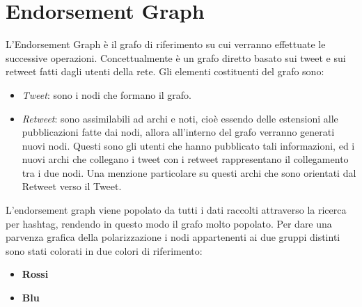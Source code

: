\section{Endorsement Graph}
L'Endorsement Graph è il grafo di riferimento su cui verranno effettuate le successive operazioni. Concettualmente è un grafo diretto basato sui tweet e sui retweet fatti dagli utenti della rete.
Gli elementi costituenti del grafo sono:
\begin{itemize}
\item \textit{Tweet}: sono i nodi che formano il grafo.
\item \textit{Retweet}: sono assimilabili ad archi e noti, cioè essendo delle estensioni alle pubblicazioni fatte dai nodi, allora all'interno del grafo verranno generati nuovi nodi. Questi sono gli utenti che hanno pubblicato tali informazioni, ed i nuovi archi che collegano i tweet con i retweet rappresentano il collegamento tra i due nodi. Una menzione particolare su questi archi che sono orientati dal Retweet verso il Tweet. 
\end{itemize}
L'endorsement graph viene popolato da tutti i dati raccolti attraverso la ricerca per hashtag, rendendo in questo modo il grafo molto popolato. 
Per dare una parvenza grafica della polarizzazione i nodi appartenenti ai due gruppi distinti sono stati colorati in due colori di riferimento:
\begin{itemize}
\item \textbf{Rossi}
\item \textbf{Blu}
\end{itemize}

